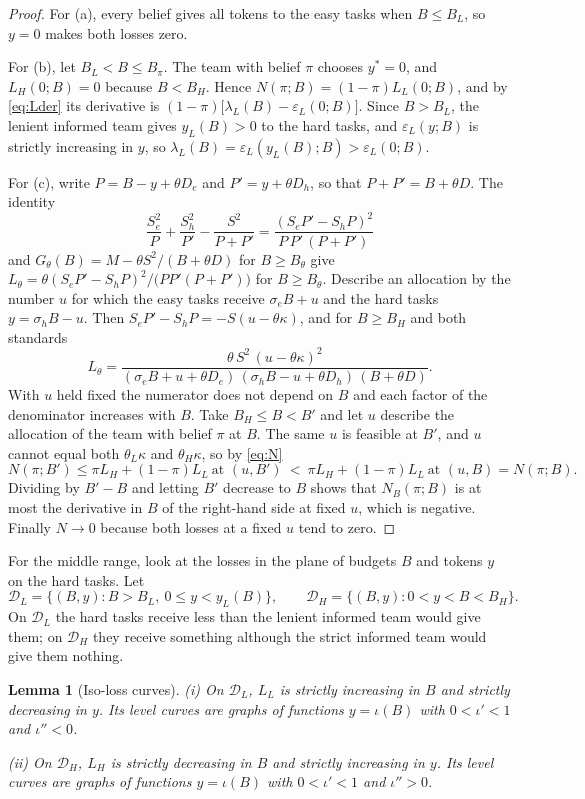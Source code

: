 \documentclass[11pt]{article}
\newtheorem{lemma}{Lemma}
\theoremstyle{definition}
\begin{document}
\begin{proof}
For (a), every belief gives all tokens to the easy tasks when $B\le B_L$, so $y=0$ makes both losses zero.

For (b), let $B_L<B\le B_\pi$. The team with belief $\pi$ chooses $y^*=0$, and $L_H(0;B)=0$ because $B<B_H$. Hence $N(\pi;B)=(1-\pi)L_L(0;B)$, and by \eqref{eq:Lder} its derivative is $(1-\pi)\bigl[\lambda_L(B)-\varepsilon_L(0;B)\bigr]$. Since $B>B_L$, the lenient informed team gives $y_L(B)>0$ to the hard tasks, and $\varepsilon_L(y;B)$ is strictly increasing in $y$, so $\lambda_L(B)=\varepsilon_L(y_L(B);B)>\varepsilon_L(0;B)$.

For (c), write $P=B-y+\theta D_e$ and $P'=y+\theta D_h$, so that $P+P'=B+\theta D$. The identity
\[
\frac{S_e^2}{P}+\frac{S_h^2}{P'}-\frac{S^2}{P+P'}=\frac{(S_eP'-S_hP)^2}{P\,P'\,(P+P')}
\]
and $G_\theta(B)=M-\theta S^2/(B+\theta D)$ for $B\ge B_\theta$ give $L_\theta=\theta(S_eP'-S_hP)^2/\bigl(PP'(P+P')\bigr)$ for $B\ge B_\theta$. Describe an allocation by the number $u$ for which the easy tasks receive $\sigma_eB+u$ and the hard tasks $y=\sigma_hB-u$. Then $S_eP'-S_hP=-S(u-\theta\kappa)$, and for $B\ge B_H$ and both standards
\[
L_\theta=\frac{\theta\,S^2\,(u-\theta\kappa)^2}{(\sigma_eB+u+\theta D_e)\,(\sigma_hB-u+\theta D_h)\,(B+\theta D)} .
\]
With $u$ held fixed the numerator does not depend on $B$ and each factor of the denominator increases with $B$. Take $B_H\le B<B'$ and let $u$ describe the allocation of the team with belief $\pi$ at $B$. The same $u$ is feasible at $B'$, and $u$ cannot equal both $\theta_L\kappa$ and $\theta_H\kappa$, so by \eqref{eq:N}
\[
N(\pi;B')\le\pi L_H+(1-\pi)L_L\ \text{at }(u,B')\ <\ \pi L_H+(1-\pi)L_L\ \text{at }(u,B)=N(\pi;B).
\]
Dividing by $B'-B$ and letting $B'$ decrease to $B$ shows that $N_B(\pi;B)$ is at most the derivative in $B$ of the right-hand side at fixed $u$, which is negative. Finally $N\to0$ because both losses at a fixed $u$ tend to zero.
\end{proof}

For the middle range, look at the losses in the plane of budgets $B$ and tokens $y$ on the hard tasks. Let
\[
\mathcal D_L=\{(B,y):B>B_L,\ 0\le y<y_L(B)\},\qquad \mathcal D_H=\{(B,y):0<y<B<B_H\}.
\]
On $\mathcal D_L$ the hard tasks receive less than the lenient informed team would give them; on $\mathcal D_H$ they receive something although the strict informed team would give them nothing.

\begin{lemma}[Iso-loss curves]\label{lem:level}
(i) On $\mathcal D_L$, $L_L$ is strictly increasing in $B$ and strictly decreasing in $y$. Its level curves are graphs of functions $y=\iota(B)$ with $0<\iota'<1$ and $\iota''<0$.

(ii) On $\mathcal D_H$, $L_H$ is strictly decreasing in $B$ and strictly increasing in $y$. Its level curves are graphs of functions $y=\iota(B)$ with $0<\iota'<1$ and $\iota''>0$.
\end{lemma}
\end{document}
